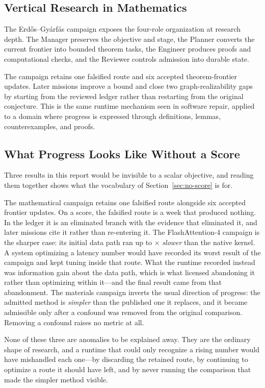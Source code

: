 \subsection{Vertical Research in Mathematics}

The Erd\H{o}s--Gy\'arf\'as campaign exposes the four-role organization at research
depth. The Manager preserves the objective and stage, the Planner converts the
current frontier into bounded theorem tasks, the Engineer produces proofs and
computational checks, and the Reviewer controls admission into durable state.

The campaign retains one falsified route and six accepted theorem-frontier updates.
Later missions improve a bound and close two graph-realizability gaps by starting
from the reviewed ledger rather than restarting from the original conjecture. This
is the same runtime mechanism seen in software repair, applied to a domain where
progress is expressed through definitions, lemmas, counterexamples, and proofs.

\subsection{What Progress Looks Like Without a Score}

Three results in this report would be invisible to a scalar objective, and reading
them together shows what the vocabulary of Section~\ref{sec:no-score} is for.

The mathematical campaign retains one falsified route alongside six accepted
frontier updates. On a score, the falsified route is a week that produced nothing.
In the ledger it is an eliminated branch with the evidence that eliminated it, and
later missions cite it rather than re-entering it. The FlashAttention-4 campaign is
the sharper case: its initial data path ran up to \FlashDAWorstRoute$\times$
\emph{slower} than the native kernel. A system optimizing a latency number would have
recorded its worst result of the campaign and kept tuning inside that route. What the
runtime recorded instead was information gain about the data path, which is what
licensed abandoning it rather than optimizing within it---and the final result came
from that abandonment. The materials campaign inverts the usual direction of
progress: the admitted method is \emph{simpler} than the published one it replaces,
and it became admissible only after a confound was removed from the original
comparison. Removing a confound raises no metric at all.

None of these three are anomalies to be explained away. They are the ordinary shape
of research, and a runtime that could only recognize a rising number would have
mishandled each one---by discarding the retained route, by continuing to optimize a
route it should have left, and by never running the comparison that made the simpler
method visible.

